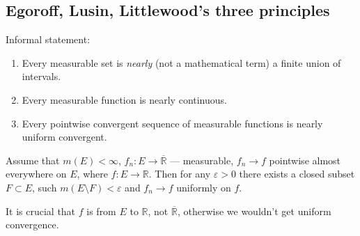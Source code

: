 \subsection{Egoroff, Lusin, Littlewood's three principles}
Informal statement:
\begin{enumerate}
    \item {
        Every measurable set is \textit{nearly} (not a mathematical term) a finite union of intervals.
    }
    \item {
        Every measurable function is nearly continuous.
    }
    \item {
        Every pointwise convergent sequence of measurable functions is nearly uniform convergent.
    }
\end{enumerate}
\begin{theorem}
    Assume that $m(E) < \infty$, 
    $f_n : E \to \overline{\mathbb{R}}$ --- measurable, $f_n \to f$
    pointwise almost everywhere on $E$, where $f : E \to \mathbb{R}$.
    Then for any $\varepsilon > 0$ there exists a closed subset
    $F \subset E$, such $m(E \setminus F) < \varepsilon$ and $f_n \to f$
    uniformly on $f$.
\end{theorem}
\begin{remark}
    It is crucial that $f$ is from $E$ to $\mathbb{R}$, not $\mathbb{\overline{R}}$,
    otherwise we wouldn't get uniform convergence.
\end{remark}
